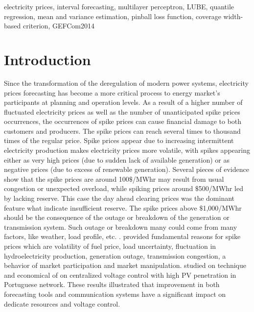 \documentclass[review]{elsarticle}
\begin{document}
\begin{frontmatter}
    \begin{keyword}
      electricity prices, interval forecasting, multilayer perceptron, LUBE, quantile regression, mean and variance estimation, pinball loss function, coverage width-based criterion, GEFCom2014
    \end{keyword}

  \end{frontmatter}

  \linenumbers

  \section{Introduction}

  Since the transformation of the deregulation of modern power systems, electricity prices forecasting has become a more critical process to energy market's participants at planning and operation levels.
  As a result of a higher number of fluctuated electricity prices as well as the number of unanticipated spike prices occurrences, the occurrences of spike prices can cause financial damage to both customers and producers.
  The spike prices can reach several times to thousand times of the regular price.
  Spike prices appear due to increasing intermittent electricity production makes electricity prices more volatile, with spikes appearing either as very high prices (due to sudden lack of available generation) or as negative prices (due to excess of renewable generation).
  Several pieces of evidence show that the spike prices are around 100$\$$/MWhr may result from usual congestion or unexpected overload, while spiking prices around $\$$500/MWhr led by lacking reserve.
  This case the day ahead clearing prices was the dominant feature what indicate insufficient reserve. The spike prices above $\$$1,000/MWhr should be the consequence of the outage or breakdown of the generation or transmission system.
  Such outage or breakdown many could come from many factors, like weather, load profile, etc. \cite{He2016}.
  \cite{SINGHAL2011550} provided fundamental reasons for spike prices which are volatility of fuel price, load uncertainty, fluctuation in hydroelectricity production, generation outage, transmission congestion, a behavior of market participation and market manipulation.
  \cite{GONZALEZSOTRES2017338} studied on technique and economical of on centralized voltage control with high PV penetration in Portuguese network.
  These results illustrated that improvement in both forecasting tools and communication systems have a significant impact on dedicate resources and voltage control.
\end{document}
